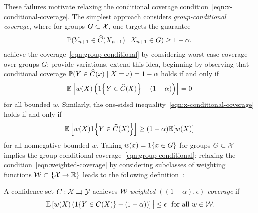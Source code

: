\documentclass{article}
\begin{document}
These failures motivate relaxing the conditional coverage
condition~\eqref{eqn:x-conditional-coverage}.
%
The simplest approach considers
\emph{group-conditional coverage}, where for groups
$G \subset \mathcal{X}$, one targets the guarantee
\begin{align}
  \label{eqn:group-conditional}
  \mathbb{P}(Y_{n + 1} \in \widehat{C}(X_{n + 1}) \mid X_{n + 1} \in G) \ge 1 - \alpha.
\end{align}
\citet[Sec.~4]{BarberCaRaTi21a} achieve the
coverage~\eqref{eqn:group-conditional} by considering worst-case coverage
over groups $G$; \citet{JungNoRaRo23} provide
variations. %
%
\citet*{GibbsChCa23} extend this idea, beginning by observing that
conditional coverage $\mathbb{P}(Y \in \widehat{C}(x) \mid X = x) = 1 - \alpha$
holds if and only if
\begin{equation}
  \label{eqn:weighted-coverage}
  \mathbb{E}\left[w(X) \left(1\!\left\{Y \in \widehat{C}(X)\right\} - (1 - \alpha)\right)\right]
  = 0
\end{equation}
for all bounded $w$.
%
Similarly, the one-sided
inequality~\eqref{eqn:x-conditional-coverage} holds if and only if
\begin{equation*}
  \mathbb{E}\left[w(X) 1\!\left\{Y \in \widehat{C}(X)\right\}\right] \ge (1 - \alpha)
  \mathbb{E}[w(X)]
\end{equation*}
for all nonnegative bounded $w$.
%
Taking $w(x) = 1\!\left\{x \in G\right\}$ for groups $G \subset \mathcal{X}$ implies the
group-conditional coverage~\eqref{eqn:group-conditional}; relaxing the
condition~\eqref{eqn:weighted-coverage} by considering subclasses of
weighting functions $\mathcal{W} \subset \{\mathcal{X} \to \mathbb{R}\}$ leads to the
following definition~\cite{GibbsChCa23}:
\begin{definition}
  \label{definition:weighted-coverage}
  A confidence set $C : \mathcal{X} \rightrightarrows \mathcal{Y}$ achieves
  \emph{$\mathcal{W}$-weighted $((1 - \alpha), \epsilon)$ coverage} if
  \begin{equation*}
    \big|
    \mathbb{E}\left[w(X) \left(1\!\left\{Y \in C(X)\right\} - (1 - \alpha)\right)\right]
    \big| \le \epsilon
    ~~ \mbox{for all}~ w \in \mathcal{W}.
  \end{equation*}
\end{definition}
\end{document}
